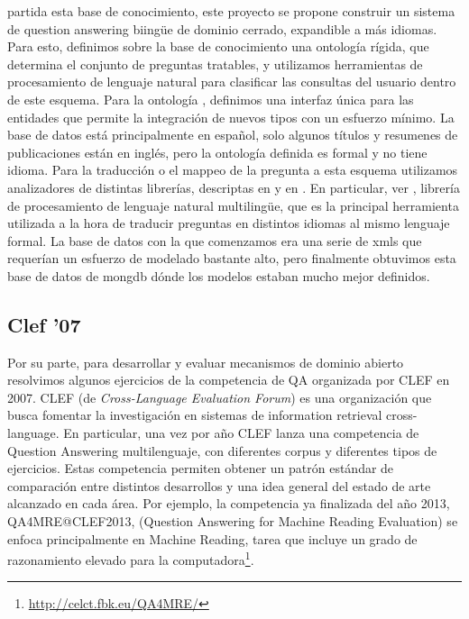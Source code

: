 partida esta base de conocimiento, este proyecto se propone construir
un sistema de question answering biingüe de dominio cerrado, expandible a más idiomas.
Para esto, definimos sobre la base de conocimiento una ontología
rígida, que determina el conjunto de preguntas tratables, y
utilizamos herramientas de procesamiento de lenguaje natural para
clasificar las consultas del usuario dentro de este esquema. Para la
ontología , definimos una interfaz única para las entidades que
permite la integración de nuevos tipos con un esfuerzo mínimo. 
La base de datos está principalmente en español, solo algunos títulos y resumenes de publicaciones están en inglés,
pero la ontología definida es formal y no tiene idioma. 
Para la traducción o el mappeo de la pregunta a esta esquema utilizamos 
analizadores de distintas librerías, descriptas en  y en .
En particular, ver , librería de procesamiento de lenguaje natural multilingüe, que
es la principal herramienta utilizada a la hora de traducir preguntas en distintos idiomas al mismo lenguaje formal.
La base de datos con la que comenzamos era una serie de xmls que requerían un esfuerzo de modelado bastante alto,
pero finalmente obtuvimos esta base de datos de mongdb dónde los modelos estaban mucho mejor definidos.

\subsection{Clef '07}
\label{subsec:clef07}
\horrible
Por su parte, para desarrollar y evaluar mecanismos de dominio abierto resolvimos algunos ejercicios de la competencia de QA organizada por CLEF 
en 2007. 
CLEF (de \textit{Cross-Language Evaluation Forum}) es una organización que busca fomentar la investigación en sistemas de information retrieval cross-language. 
En particular, una vez por año CLEF lanza una competencia de Question Answering multilenguaje, con diferentes corpus y diferentes tipos de ejercicios. Estas competencia permiten obtener un patrón estándar de comparación entre distintos desarrollos y una idea general del estado de arte alcanzado en cada área.
Por ejemplo, la competencia ya finalizada del año 2013, QA4MRE@CLEF2013, (Question Answering for Machine Reading Evaluation) se enfoca principalmente en Machine Reading, tarea que incluye un grado de razonamiento elevado para la computadora\footnote{\url{http://celct.fbk.eu/QA4MRE/}}.

